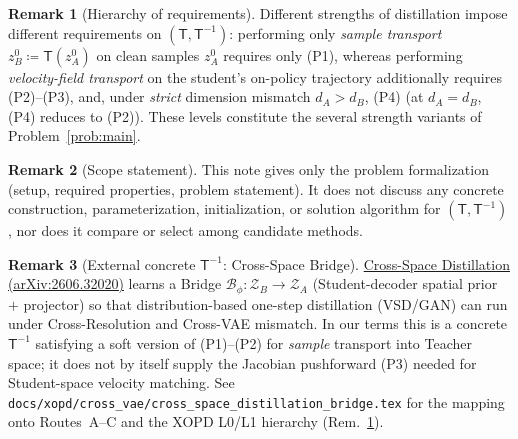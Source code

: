 \documentclass[11pt,a4paper]{article}
\newcommand{\Za}{\mathcal{Z}_{A}}
\newcommand{\Zb}{\mathcal{Z}_{B}}
\newcommand{\Tmap}{\mathsf{T}}
\newcommand{\Tinv}{\mathsf{T}^{-1}}
\theoremstyle{definition}
\newtheorem{remark}{Remark}
\begin{document}
\begin{remark}[Hierarchy of requirements]
\label{rem:layering}
Different strengths of distillation impose different requirements on $(\Tmap,\Tinv)$: performing
only \emph{sample transport} $z_B^{0}\coloneqq\Tmap(z_A^{0})$ on clean samples $z_A^{0}$ requires only
(P1), whereas performing \emph{velocity-field transport} on the student's on-policy trajectory
additionally requires (P2)--(P3), and, under \emph{strict} dimension mismatch $d_A>d_B$, (P4)
(at $d_A=d_B$, (P4) reduces to (P2)). These levels constitute the several strength variants of
Problem~\ref{prob:main}.
\end{remark}

\begin{remark}[Scope statement]
This note gives only the problem formalization (setup, required properties, problem statement). It
does not discuss any concrete construction, parameterization, initialization, or solution algorithm
for $(\Tmap,\Tinv)$, nor does it compare or select among candidate methods.
\end{remark}

\begin{remark}[External concrete $\Tinv$: Cross-Space Bridge]
\label{rem:bridge}
\href{https://arxiv.org/abs/2606.32020}{Cross-Space Distillation (arXiv:2606.32020)} learns a
Bridge $\mathcal{B}_\phi:\Zb\to\Za$ (Student-decoder spatial prior $+$ projector) so that
distribution-based one-step distillation (VSD/GAN) can run under Cross-Resolution and Cross-VAE
mismatch. In our terms this is a concrete $\Tinv$ satisfying a soft version of (P1)--(P2) for
\emph{sample} transport into Teacher space; it does not by itself supply the Jacobian pushforward
(P3) needed for Student-space velocity matching. See
\texttt{docs/xopd/cross\_vae/cross\_space\_distillation\_bridge.tex} for the mapping onto Routes~A--C and
the XOPD L0/L1 hierarchy (Rem.~\ref{rem:layering}).
\end{remark}
\end{document}
